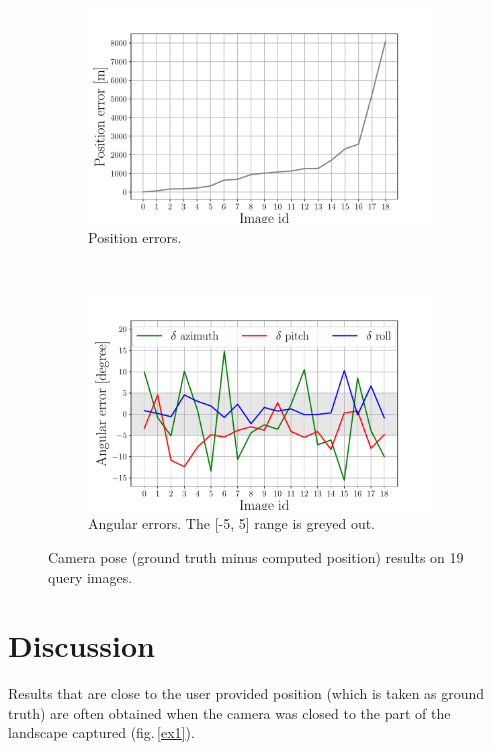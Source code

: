 \documentclass[fleqn,10pt,lineno]{wlpeerj} %
\begin{document}
\begin{figure}[H]
\centering
\begin{subfigure}{0.48\linewidth}
    \includegraphics[width=1\linewidth]{pos.pdf}
    \caption{Position errors.}
    \label{pose:1}
\end{subfigure}
~
\begin{subfigure}{0.48\linewidth}
    \includegraphics[width=1\linewidth]{angles.pdf}
    \caption{Angular errors. The [-5, 5] range is greyed out.}
    \label{pose:2}
\end{subfigure}
\caption{Camera pose (ground truth minus computed position) results on 19 query images.}
\label{pose}
\end{figure}




\section*{Discussion}
Results that are close to the user provided position (which is taken as ground truth) 
are often obtained when the camera was closed to the part of the landscape 
captured (fig.\,\ref{ex1}).
\end{document}
